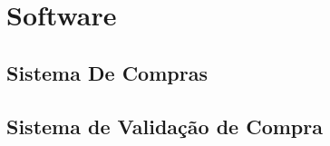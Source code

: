 \chapter[Software]{Software}
    
    \section[Sistema De Compras]{Sistema De Compras}
    
    \section[Sistema de Validação de Compra]{Sistema de Validação de Compra}
